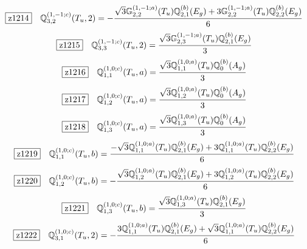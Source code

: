 \documentclass[fleqn,10pt,landscape]{jsarticle}
\begin{document}
\begin{dmath*}
\hspace*{3mm}\fbox{z1214}\quad \mathbb{Q}_{3,2}^{(1,-1;c)}(T_{u},2)=- \frac{\sqrt{3} \mathbb{G}_{2,2}^{(1,-1;a)}(T_{u}) \mathbb{Q}_{2,1}^{(b)}(E_{g}) + 3 \mathbb{G}_{2,2}^{(1,-1;a)}(T_{u}) \mathbb{Q}_{2,2}^{(b)}(E_{g})}{6}
\end{dmath*}
\begin{dmath*}
\hspace*{3mm}\fbox{z1215}\quad \mathbb{Q}_{3,3}^{(1,-1;c)}(T_{u},2)=\frac{\sqrt{3} \mathbb{G}_{2,3}^{(1,-1;a)}(T_{u}) \mathbb{Q}_{2,1}^{(b)}(E_{g})}{3}
\end{dmath*}
\begin{dmath*}
\hspace*{3mm}\fbox{z1216}\quad \mathbb{Q}_{1,1}^{(1,0;c)}(T_{u},a)=\frac{\sqrt{3} \mathbb{Q}_{1,1}^{(1,0;a)}(T_{u}) \mathbb{Q}_{0}^{(b)}(A_{g})}{3}
\end{dmath*}
\begin{dmath*}
\hspace*{3mm}\fbox{z1217}\quad \mathbb{Q}_{1,2}^{(1,0;c)}(T_{u},a)=\frac{\sqrt{3} \mathbb{Q}_{1,2}^{(1,0;a)}(T_{u}) \mathbb{Q}_{0}^{(b)}(A_{g})}{3}
\end{dmath*}
\begin{dmath*}
\hspace*{3mm}\fbox{z1218}\quad \mathbb{Q}_{1,3}^{(1,0;c)}(T_{u},a)=\frac{\sqrt{3} \mathbb{Q}_{1,3}^{(1,0;a)}(T_{u}) \mathbb{Q}_{0}^{(b)}(A_{g})}{3}
\end{dmath*}
\begin{dmath*}
\hspace*{3mm}\fbox{z1219}\quad \mathbb{Q}_{1,1}^{(1,0;c)}(T_{u},b)=\frac{- \sqrt{3} \mathbb{Q}_{1,1}^{(1,0;a)}(T_{u}) \mathbb{Q}_{2,1}^{(b)}(E_{g}) + 3 \mathbb{Q}_{1,1}^{(1,0;a)}(T_{u}) \mathbb{Q}_{2,2}^{(b)}(E_{g})}{6}
\end{dmath*}
\begin{dmath*}
\hspace*{3mm}\fbox{z1220}\quad \mathbb{Q}_{1,2}^{(1,0;c)}(T_{u},b)=- \frac{\sqrt{3} \mathbb{Q}_{1,2}^{(1,0;a)}(T_{u}) \mathbb{Q}_{2,1}^{(b)}(E_{g}) + 3 \mathbb{Q}_{1,2}^{(1,0;a)}(T_{u}) \mathbb{Q}_{2,2}^{(b)}(E_{g})}{6}
\end{dmath*}
\begin{dmath*}
\hspace*{3mm}\fbox{z1221}\quad \mathbb{Q}_{1,3}^{(1,0;c)}(T_{u},b)=\frac{\sqrt{3} \mathbb{Q}_{1,3}^{(1,0;a)}(T_{u}) \mathbb{Q}_{2,1}^{(b)}(E_{g})}{3}
\end{dmath*}
\begin{dmath*}
\hspace*{3mm}\fbox{z1222}\quad \mathbb{Q}_{3,1}^{(1,0;c)}(T_{u},2)=- \frac{3 \mathbb{Q}_{1,1}^{(1,0;a)}(T_{u}) \mathbb{Q}_{2,1}^{(b)}(E_{g}) + \sqrt{3} \mathbb{Q}_{1,1}^{(1,0;a)}(T_{u}) \mathbb{Q}_{2,2}^{(b)}(E_{g})}{6}
\end{dmath*}
\end{document}
